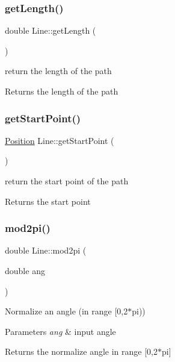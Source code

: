 \subsubsection{\texorpdfstring{get\+Length()}{getLength()}}
{\footnotesize\ttfamily double Line\+::get\+Length (\begin{DoxyParamCaption}{ }\end{DoxyParamCaption})}

return the length of the path \begin{DoxyReturn}{Returns}
the length of the path 
\end{DoxyReturn}
\mbox{\label{class_line_aa9924a540d8ba2da841a414c58dafb56}} 
\subsubsection{\texorpdfstring{get\+Start\+Point()}{getStartPoint()}}
{\footnotesize\ttfamily \mbox{\hyperlink{class_position}{Position}} Line\+::get\+Start\+Point (\begin{DoxyParamCaption}{ }\end{DoxyParamCaption})}



return the start point of the path 

\begin{DoxyReturn}{Returns}
the start point 
\end{DoxyReturn}
\mbox{\label{class_line_aa30f3bd50c4de544874c4aaad0a24c6a}} 
\subsubsection{\texorpdfstring{mod2pi()}{mod2pi()}}
{\footnotesize\ttfamily double Line\+::mod2pi (\begin{DoxyParamCaption}\item[{double}]{ang }\end{DoxyParamCaption})}



Normalize an angle (in range \mbox{[}0,2$\ast$pi)) 


\begin{DoxyParams}{Parameters}
{\em ang} & input angle \\
\hline
\end{DoxyParams}
\begin{DoxyReturn}{Returns}
the normalize angle in range \mbox{[}0,2$\ast$pi\mbox{]} 
\end{DoxyReturn}
\mbox{\label{class_line_a47359d43675ff78f2b0af8378d952387}} 
